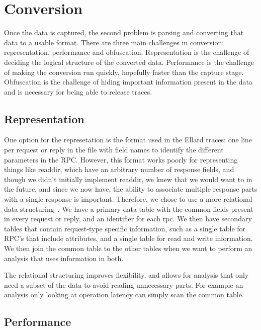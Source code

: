 \section{Conversion}
\label{sec:conversion}

Once the data is captured, the second problem is parsing and
converting that data to a usable format.  There are three main
challenges in conversion: representation, performance and obfuscation.
Representation is the challenge of deciding the logical structure of
the converted data.  Performance is the challenge of making the
conversion run quickly, hopefully faster than the capture stage.
Obfuscation is the challenge of hiding important information present
in the data and is necessary for being able to release traces.


\subsection{Representation}

One option for the represetation is the format used in the
Ellard\cite{ellardTraces} traces: one line per request or reply in the
file with field names to identify the different parameters in the RPC.
However, this format works poorly for representing things like
readdir, which have an arbitrary number of response fields, and though
we didn't initially implement readdir, we knew that we would want to
in the future, and since we now have, the ability to associate
multiple response parts with a single response is important.
Therefore, we chose to use a more relational data
structuring~\cite{codd70relational}.  We have a primary data table
with the common fields present in every request or reply, and an
identifier for each rpc.  We then have secondary tables that contain
request-type specific information, such as a single table for RPC's
that include attributes, and a single table for read and write
information.  We then join the common table to the other tables when
we want to perform an analysis that uses information in both.

The relational structuring improves flexibility, and allows for
analysis that only need a subset of the data to avoid reading
unnecessary parts.  For example an analysis only looking at operation
latency can simply scan the common table.

\subsection{Performance}

